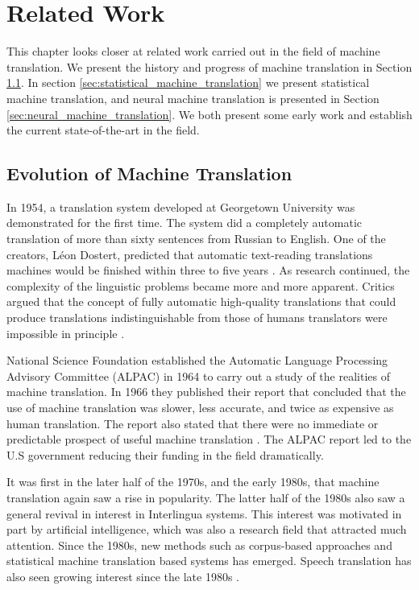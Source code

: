 
\chapter{Related Work}
\label{ch:related_work}
This chapter looks closer at related work carried out in the field of machine translation. We present the history and progress of machine translation in Section \ref{sec:natural_language_processing}. In section \ref{sec:statistical_machine_translation} we present statistical machine translation, and neural machine translation is presented in Section \ref{sec:neural_machine_translation}. We both present some early work and establish the current state-of-the-art in the field.


\section{Evolution of Machine Translation}
\label{sec:natural_language_processing}
In 1954, a translation system developed at Georgetown University was demonstrated for the first time. The system did a completely automatic translation of more than sixty sentences from Russian to English. One of the creators, Léon Dostert, predicted that automatic text-reading translations machines would be finished within three to five years \citep{hutchins1997first}. As research continued, the complexity of the linguistic problems became more and more apparent. Critics argued that the concept of fully automatic high-quality translations that could produce translations indistinguishable from those of humans translators were impossible in principle \citep{hutchins2007machine}. 

National Science Foundation established the Automatic Language Processing Advisory Committee (ALPAC) in 1964 to carry out a study of the realities of machine translation. In 1966 they published their report that concluded that the use of machine translation was slower, less accurate, and twice as expensive as human translation. The report also stated that there were no immediate or predictable prospect of useful machine translation \citep{hutchins2007machine, national1966language, koehn2010statistical}. The ALPAC report led to the U.S government reducing their funding in the field dramatically.

It was first in the later half of the 1970s, and the early 1980s, that machine translation again saw a rise in popularity. The latter half of the 1980s also saw a general revival in interest in Interlingua systems. This interest was motivated in part by artificial intelligence, which was also a research field that attracted much attention. Since the 1980s, new methods such as corpus-based approaches and statistical machine translation based systems has emerged. Speech translation has also seen growing interest since the late 1980s \citep{hutchins2007machine}.

